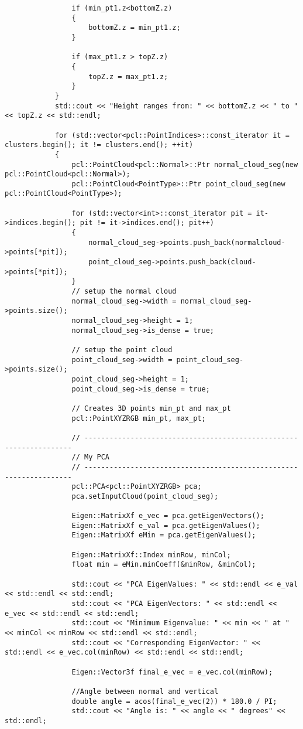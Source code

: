 \begin{lstlisting}
				if (min_pt1.z<bottomZ.z)
				{
					bottomZ.z = min_pt1.z;
				}

				if (max_pt1.z > topZ.z)
				{
					topZ.z = max_pt1.z;
				}
			}
			std::cout << "Height ranges from: " << bottomZ.z << " to " << topZ.z << std::endl;

			for (std::vector<pcl::PointIndices>::const_iterator it = clusters.begin(); it != clusters.end(); ++it)
			{
				pcl::PointCloud<pcl::Normal>::Ptr normal_cloud_seg(new pcl::PointCloud<pcl::Normal>);
				pcl::PointCloud<PointType>::Ptr point_cloud_seg(new pcl::PointCloud<PointType>);

				for (std::vector<int>::const_iterator pit = it->indices.begin(); pit != it->indices.end(); pit++)
				{
					normal_cloud_seg->points.push_back(normalcloud->points[*pit]);
					point_cloud_seg->points.push_back(cloud->points[*pit]);
				}
				// setup the normal cloud
				normal_cloud_seg->width = normal_cloud_seg->points.size();
				normal_cloud_seg->height = 1;
				normal_cloud_seg->is_dense = true;

				// setup the point cloud
				point_cloud_seg->width = point_cloud_seg->points.size();
				point_cloud_seg->height = 1;
				point_cloud_seg->is_dense = true;

				// Creates 3D points min_pt and max_pt
				pcl::PointXYZRGB min_pt, max_pt;

				// -------------------------------------------------------------------
				// My PCA
				// -------------------------------------------------------------------
				pcl::PCA<pcl::PointXYZRGB> pca;
				pca.setInputCloud(point_cloud_seg);

				Eigen::MatrixXf e_vec = pca.getEigenVectors();
				Eigen::MatrixXf e_val = pca.getEigenValues();
				Eigen::MatrixXf eMin = pca.getEigenValues();

				Eigen::MatrixXf::Index minRow, minCol;
				float min = eMin.minCoeff(&minRow, &minCol);

				std::cout << "PCA EigenValues: " << std::endl << e_val << std::endl << std::endl;
				std::cout << "PCA EigenVectors: " << std::endl << e_vec << std::endl << std::endl;
				std::cout << "Minimum Eigenvalue: " << min << " at " << minCol << minRow << std::endl << std::endl;
				std::cout << "Corresponding EigenVector: " << std::endl << e_vec.col(minRow) << std::endl << std::endl;

				Eigen::Vector3f final_e_vec = e_vec.col(minRow);

				//Angle between normal and vertical
				double angle = acos(final_e_vec(2)) * 180.0 / PI;
				std::cout << "Angle is: " << angle << " degrees" << std::endl;
				

\end{lstlisting}
